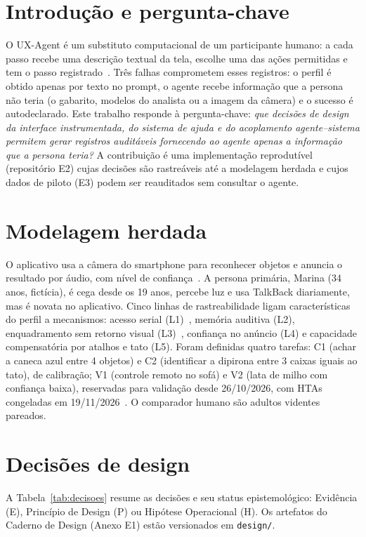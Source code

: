 \documentclass[conference]{IEEEtran}
\begin{document}
\section{Introdução e pergunta-chave}
O UX-Agent é um substituto computacional de um participante humano: a cada passo recebe uma descrição textual da tela, escolhe uma das ações permitidas e tem o passo registrado~\cite{enunciado}. Três falhas comprometem esses registros: o perfil é obtido apenas por texto no prompt, o agente recebe informação que a persona não teria (o gabarito, modelos do analista ou a imagem da câmera) e o sucesso é autodeclarado. Este trabalho responde à pergunta-chave: \emph{que decisões de design da interface instrumentada, do sistema de ajuda e do acoplamento agente--sistema permitem gerar registros auditáveis fornecendo ao agente apenas a informação que a persona teria?} A contribuição é uma implementação reprodutível (repositório E2) cujas decisões são rastreáveis até a modelagem herdada e cujos dados de piloto (E3) podem ser reauditados sem consultar o agente.

\section{Modelagem herdada}
O aplicativo usa a câmera do smartphone para reconhecer objetos e anuncia o resultado por áudio, com nível de confiança~\cite{modelagem,alinhamento}. A persona primária, Marina (34 anos, fictícia), é cega desde os 19 anos, percebe luz e usa TalkBack diariamente, mas é novata no aplicativo. Cinco linhas de rastreabilidade ligam características do perfil a mecanismos: acesso serial (L1)~\cite{tan2024}, memória auditiva (L2), enquadramento sem retorno visual (L3)~\cite{manduchi}, confiança no anúncio (L4) e capacidade compensatória por atalhos e tato (L5). Foram definidas quatro tarefas: C1 (achar a caneca azul entre 4 objetos) e C2 (identificar a dipirona entre 3 caixas iguais ao tato), de calibração; V1 (controle remoto no sofá) e V2 (lata de milho com confiança baixa), reservadas para validação desde 26/10/2026, com HTAs congeladas em 19/11/2026~\cite{annett}. O comparador humano são adultos videntes pareados.

\section{Decisões de design}
A Tabela~\ref{tab:decisoes} resume as decisões e seu status epistemológico: Evidência (E), Princípio de Design (P) ou Hipótese Operacional (H). Os artefatos do Caderno de Design (Anexo E1) estão versionados em \texttt{design/}.
\end{document}

